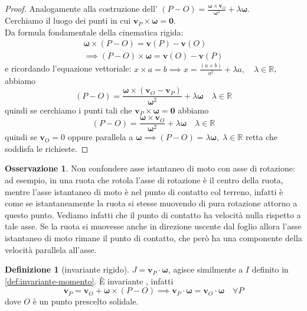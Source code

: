 \documentclass[a4paper,10pt]{article}
\theoremstyle{definition}
\newcommand{\bv}{\boldsymbol} %
\newcommand{\re}{\mathbb{R}} %
\theoremstyle{indentdefinition}
\newtheorem{defn}{Definizione}[section]
\theoremstyle{indenttheorem}
\theoremstyle{myremark}
\newtheorem*{rem*}{Osservazione}
\theoremstyle{indentgeneral}
\begin{document}
\begin{proof}
Analogamente alla costruzione dell' $\left(P-O\right)=\frac{\boldsymbol{\omega}\times\boldsymbol{v}_{O}}{\boldsymbol{\omega}^{2}}+\lambda\boldsymbol{\omega}$.\\
Cerchiamo il luogo dei punti in cui $\bv{v}_P\times\bv{\omega}=\bv{0}$. \\
Da formula fondamentale della cinematica rigida:
\begin{align*}
   \boldsymbol{\omega}\times\left(P-O\right)=\boldsymbol{v}\left(P\right)-\boldsymbol{v}\left(O\right)\\
   \implies  \left(P-O\right)\times\boldsymbol{\omega}=\boldsymbol{v}\left(O\right)-\boldsymbol{v}\left(P\right)
\end{align*}
e ricordando l'equazione vettoriale: $x\times a=b \implies
x=\frac{\left(a\times b\right)}{a^{2}}+\lambda a, \quad\lambda\in\re
$, abbiamo 
$$\left(P-O\right)=\frac{\boldsymbol{\omega}\times(\boldsymbol{v}_{O}-\bv{v}_P)}{\boldsymbol{\omega}^{2}}+\lambda\boldsymbol{\omega} \quad \lambda\in\re$$
quindi se cerchiamo i punti tali che $\bv{v}_P\times\bv{\omega}=\bv{0}$ abbiamo
$$\left(P-O\right)=\frac{\boldsymbol{\omega}\times\boldsymbol{v}_{O}}{\boldsymbol{\omega}^{2}}+\lambda\boldsymbol{\omega}  \quad \lambda\in\re$$
quindi se $\bv{v}_O=0$ oppure parallela a $\bv{\omega}\implies(P-O)=\lambda\bv{\omega}, \;\lambda\in\re$ retta che soddisfa le richieste.
\end{proof}


\begin{rem*}
    Non confondere asse istantaneo di moto con asse di rotazione: ad esempio, in una ruota che rotola l'asse di rotazione è il centro della ruota, mentre l'asse istantaneo di moto è nel punto di contatto col terreno, infatti è come se istantaneamente la ruota si stesse muovendo di pura rotazione attorno a questo punto. Vediamo infatti che il punto di contatto ha velocità nulla rispetto  a tale asse. Se la ruota si muovesse anche in direzione uscente dal foglio allora l'asse istantaneo di moto rimane il punto di contatto, che però ha una componente della velocità parallela all'asse.
\end{rem*}

\begin{defn}[invariante rigido]
\label{def:invariante-rigido}$J=\boldsymbol{v}_{P}\cdot\boldsymbol{\omega}$,
agisce similmente a $I$ definito in \ref{def:invariante-momento}. È invariante , infatti 
$$\bv{v}_P=\bv{v}_O+\bv{\omega}\times(P-O)\implies \bv{v}_P\cdot\bv{\omega}=\bv{v}_O\cdot\bv{\omega} \quad\forall P$$
dove $O$ è un punto prescelto solidale.
\end{defn}
\end{document}
